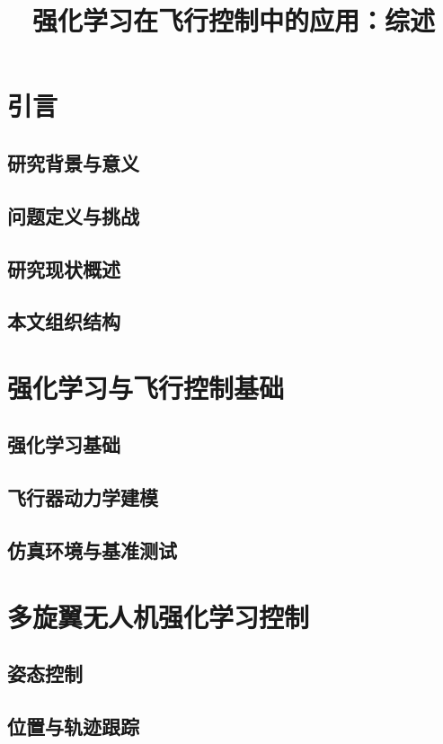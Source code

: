 \documentclass[12pt,a4paper]{ctexart}
\title{强化学习在飞行控制中的应用：综述}
\author{}
\date{}
\begin{document}
\maketitle
\tableofcontents
\newpage

\section{引言}
\subsection{研究背景与意义}
\subsection{问题定义与挑战}
\subsection{研究现状概述}
\subsection{本文组织结构}

\section{强化学习与飞行控制基础}
\subsection{强化学习基础}
\subsection{飞行器动力学建模}
\subsection{仿真环境与基准测试}

\section{多旋翼无人机强化学习控制}
\subsection{姿态控制}
\subsection{位置与轨迹跟踪}
\end{document}
